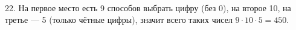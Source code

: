 22. На первое место есть 9 способов выбрать цифру (без 0), на второе 10, на третье --- 5 (только чётные цифры), значит всего таких чисел $9\cdot10\cdot5=450.$\\
